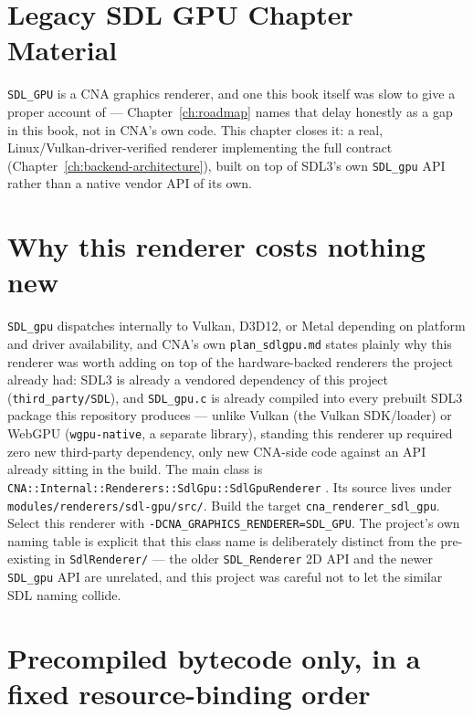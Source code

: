 \section{Legacy SDL GPU Chapter Material}
\label{ch:sdlgpu-backend}

\texttt{SDL\_GPU} is a CNA graphics renderer, and one this book itself was slow to
give a proper account of --- Chapter~\ref{ch:roadmap} names that delay honestly as a gap in
this book, not in CNA's own code. This chapter closes it: a real, Linux/Vulkan-driver-verified
renderer implementing the full  contract
(Chapter~\ref{ch:backend-architecture}), built on top of SDL3's own \texttt{SDL\_gpu} API
rather than a native vendor API of its own.

\section{Why this renderer costs nothing new}

\texttt{SDL\_gpu} dispatches internally to Vulkan, D3D12, or Metal depending on platform and
driver availability, and CNA's own \texttt{plan\_sdlgpu.md} states plainly why this renderer was
worth adding on top of the hardware-backed renderers the project already had: SDL3 is
already a vendored dependency of this project (\texttt{third\_party/SDL}), and
\texttt{SDL\_gpu.c} is already compiled into every prebuilt SDL3 package this repository
produces --- unlike Vulkan (the Vulkan SDK/loader) or WebGPU (\texttt{wgpu-native}, a separate
library), standing this renderer up required zero new third-party dependency, only new CNA-side
code against an API already sitting in the build. The main class is
\texttt{CNA::\allowbreak{}Internal::\allowbreak{}Renderers::\allowbreak{}SdlGpu::\allowbreak{}SdlGpuRenderer}
.
Its source lives under
\texttt{modules/renderers/sdl-gpu/src/}. Build the target
\texttt{cna\_\allowbreak{}renderer\_\allowbreak{}sdl\_\allowbreak{}gpu}. Select this renderer with
\texttt{-DCNA\_\allowbreak{}GRAPHICS\_\allowbreak{}RENDERER=SDL\_\allowbreak{}GPU}.
The project's own naming table is explicit that this class name is deliberately distinct from
the pre-existing  in \texttt{SdlRenderer/} --- the older
\texttt{SDL\_Renderer} 2D API and the newer \texttt{SDL\_gpu} API are unrelated, and this project
was careful not to let the similar SDL naming collide.

\section{Precompiled bytecode only, in a fixed resource-binding order}

